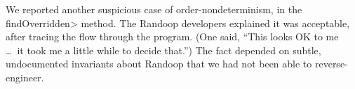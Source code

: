 We reported another suspicious case of order-nondeterminism, in the
\<findOverridden> method.  The Randoop developers explained it was
acceptable, after tracing the flow through the program.  (One said, ``This
looks OK to me \ldots\ it took me a little while to decide that.'')  The fact
depended on subtle, undocumented invariants about Randoop that we had not
been able to reverse-engineer.
